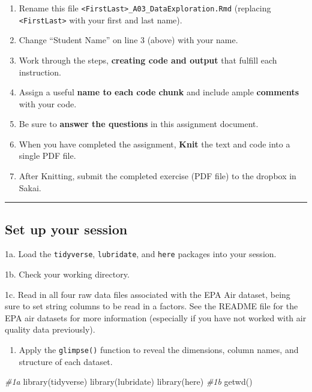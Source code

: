 \documentclass[
]{article}
\newenvironment{Shaded}{\begin{snugshade}}{\end{snugshade}}
\newcommand{\CommentTok}[1]{\textcolor[rgb]{0.56,0.35,0.01}{\textit{#1}}}
\newcommand{\FunctionTok}[1]{\textcolor[rgb]{0.00,0.00,0.00}{#1}}
\newcommand{\NormalTok}[1]{#1}
\providecommand{\tightlist}{%
  \setlength{\itemsep}{0pt}\setlength{\parskip}{0pt}}
\begin{document}
\begin{enumerate}
\def\labelenumi{\arabic{enumi}.}
\tightlist
\item
  Rename this file
  \texttt{\textless{}FirstLast\textgreater{}\_A03\_DataExploration.Rmd}
  (replacing \texttt{\textless{}FirstLast\textgreater{}} with your first
  and last name).
\item
  Change ``Student Name'' on line 3 (above) with your name.
\item
  Work through the steps, \textbf{creating code and output} that fulfill
  each instruction.
\item
  Assign a useful \textbf{name to each code chunk} and include ample
  \textbf{comments} with your code.
\item
  Be sure to \textbf{answer the questions} in this assignment document.
\item
  When you have completed the assignment, \textbf{Knit} the text and
  code into a single PDF file.
\item
  After Knitting, submit the completed exercise (PDF file) to the
  dropbox in Sakai.
\end{enumerate}

\begin{center}\rule{0.5\linewidth}{0.5pt}\end{center}

\hypertarget{set-up-your-session-1}{%
\subsection{Set up your session}\label{set-up-your-session-1}}

1a. Load the \texttt{tidyverse}, \texttt{lubridate}, and \texttt{here}
packages into your session.

1b. Check your working directory.

1c. Read in all four raw data files associated with the EPA Air dataset,
being sure to set string columns to be read in a factors. See the README
file for the EPA air datasets for more information (especially if you
have not worked with air quality data previously).

\begin{enumerate}
\def\labelenumi{\arabic{enumi}.}
\setcounter{enumi}{1}
\tightlist
\item
  Apply the \texttt{glimpse()} function to reveal the dimensions, column
  names, and structure of each dataset.
\end{enumerate}

\begin{Shaded}
\begin{Highlighting}[]
\CommentTok{\#1a }
\FunctionTok{library}\NormalTok{(tidyverse)}
\FunctionTok{library}\NormalTok{(lubridate)}
\FunctionTok{library}\NormalTok{(here)}
\CommentTok{\#1b }
\FunctionTok{getwd}\NormalTok{()}
\end{Highlighting}
\end{Shaded}
\end{document}
